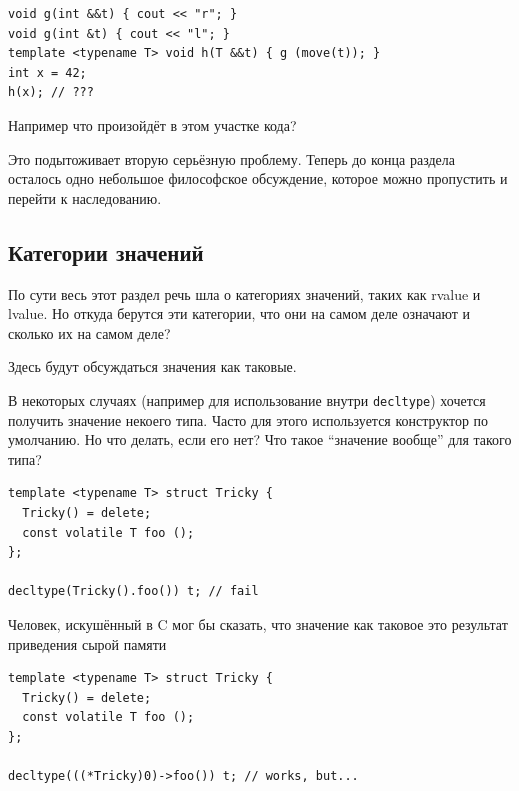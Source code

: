 \documentclass[a4paper,12pt,oneside]{book}
\newif\ifanswers
\begin{document}
\begin{lstlisting}
void g(int &&t) { cout << "r"; }
void g(int &t) { cout << "l"; }
template <typename T> void h(T &&t) { g (move(t)); } 
int x = 42;
h(x); // ???
\end{lstlisting}

Например что произойдёт в этом участке кода?

\ifanswers
Правильный ответ: после размотки

\begin{lstlisting}
int&& almost_move<int&>(int& a) {
  using rv_ref_t = int&&;
  return static_cast<rv_ref_t>(a);
} 
\end{lstlisting}

Таким образом будет напечатано ``r''
\fi

Это подытоживает вторую серьёзную проблему. Теперь до конца раздела осталось одно небольшое философское обсуждение, которое можно пропустить и перейти к наследованию.

\subsection{Категории значений}

По сути весь этот раздел речь шла о категориях значений, таких как rvalue и lvalue. Но откуда берутся эти категории, что они на самом деле означают и сколько их на самом деле?

Здесь будут обсуждаться значения как таковые.

В некоторых случаях (например для использование внутри \lstinline!decltype!) хочется получить значение некоего типа. Часто для этого используется конструктор по умолчанию. Но что делать, если его нет? Что такое ``значение вообще'' для такого типа?

\begin{lstlisting}
template <typename T> struct Tricky {
  Tricky() = delete;
  const volatile T foo ();
};

decltype(Tricky().foo()) t; // fail
\end{lstlisting}

Человек, искушённый в C мог бы сказать, что значение как таковое это результат приведения сырой памяти

\begin{lstlisting}
template <typename T> struct Tricky {
  Tricky() = delete;
  const volatile T foo ();
};

decltype(((*Tricky)0)->foo()) t; // works, but...
\end{lstlisting}
\end{document}
